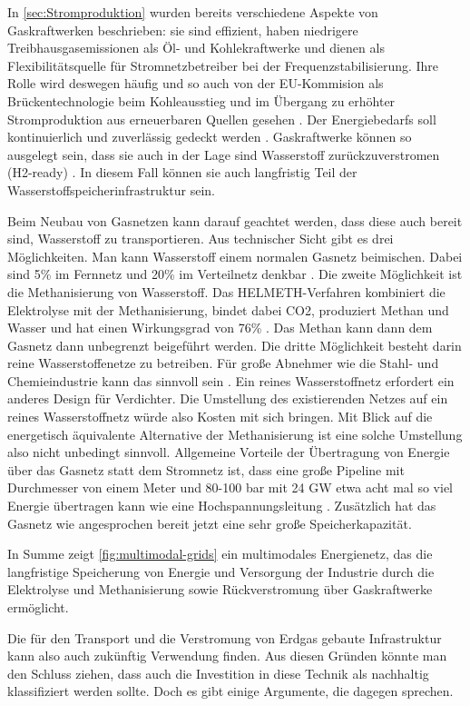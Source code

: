 In \autoref{sec:Stromproduktion} wurden bereits verschiedene Aspekte von Gaskraftwerken beschrieben: sie sind effizient, haben niedrigere Treibhausgasemissionen als Öl- und Kohlekraftwerke und dienen als Flexibilitätsquelle für Stromnetzbetreiber bei der Frequenzstabilisierung.
Ihre Rolle wird deswegen häufig und so auch von der EU-Kommision als Brückentechnologie beim Kohleausstieg und im Übergang zu erhöhter Stromproduktion aus erneuerbaren Quellen gesehen \cite{reuters, eu-komm}.
Der Energiebedarfs soll kontinuierlich und zuverlässig gedeckt werden \cite{uba}.
Gaskraftwerke können so ausgelegt sein, dass sie auch in der Lage sind Wasserstoff zurückzuverstromen (H2-ready) \cite{rnd}. In diesem Fall können sie auch langfristig Teil der Wasserstoffspeicherinfrastruktur sein. 

Beim Neubau von Gasnetzen kann darauf geachtet werden, dass diese auch bereit sind, Wasserstoff zu transportieren. Aus technischer Sicht gibt es drei Möglichkeiten. Man kann Wasserstoff einem normalen Gasnetz beimischen. Dabei sind 5\% im Fernnetz und 20\% im Verteilnetz denkbar \cite{iis}. Die zweite Möglichkeit ist die Methanisierung von Wasserstoff. Das HELMETH-Verfahren kombiniert die Elektrolyse mit der Methanisierung, bindet dabei CO2, produziert Methan und Wasser und hat einen Wirkungsgrad von 76\% \cite{helmeth}. Das Methan kann dann dem Gasnetz dann unbegrenzt beigeführt werden. Die dritte Möglichkeit besteht darin reine Wasserstoffenetze zu betreiben. Für große Abnehmer wie die Stahl- und Chemieindustrie kann das sinnvoll sein \cite{iis}. Ein reines Wasserstoffnetz erfordert ein anderes Design für Verdichter. Die Umstellung des existierenden Netzes auf ein reines Wasserstoffnetz würde also Kosten mit sich bringen. Mit Blick auf die energetisch äquivalente Alternative der Methanisierung ist eine solche Umstellung also nicht unbedingt sinnvoll.
Allgemeine Vorteile der Übertragung von Energie über das Gasnetz statt dem Stromnetz ist, dass eine große Pipeline mit Durchmesser von einem Meter und 80-100 bar mit 24 GW etwa acht mal so viel Energie übertragen kann wie eine Hochspannungsleitung \cite{iis}. Zusätzlich hat das Gasnetz wie angesprochen bereit jetzt eine sehr große Speicherkapazität.

In Summe zeigt \autoref{fig:multimodal-grids} ein multimodales Energienetz, das die langfristige Speicherung von Energie und Versorgung der Industrie durch die Elektrolyse und Methanisierung sowie Rückverstromung über Gaskraftwerke ermöglicht.

Die für den Transport und die Verstromung von Erdgas gebaute Infrastruktur kann also auch zukünftig Verwendung finden. Aus diesen Gründen könnte man den Schluss ziehen, dass auch die Investition in diese Technik als nachhaltig klassifiziert werden sollte. Doch es gibt einige Argumente, die dagegen sprechen.

